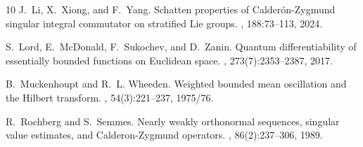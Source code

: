 \documentclass[reqno]{amsart}
\theoremstyle{plain}
\theoremstyle{definition}
\theoremstyle{remark}
\begin{document}
\begin{thebibliography}{10}
J.~Li, X.~Xiong, and F.~Yang.
\newblock Schatten properties of {C}alder\'on-{Z}ygmund singular integral
  commutator on stratified {L}ie groups.
, 188:73--113, 2024.

S.~Lord, E.~McDonald, F.~Sukochev, and D.~Zanin.
\newblock Quantum differentiability of essentially bounded functions on
  {E}uclidean space.
, 273(7):2353--2387, 2017.

B.~Muckenhoupt and R.~L. Wheeden.
\newblock Weighted bounded mean oscillation and the {H}ilbert transform.
, 54(3):221--237, 1975/76.

R.~Rochberg and S.~Semmes.
\newblock Nearly weakly orthonormal sequences, singular value estimates, and
  {C}alderon-{Z}ygmund operators.
, 86(2):237--306, 1989.

\end{thebibliography}
\end{document}
